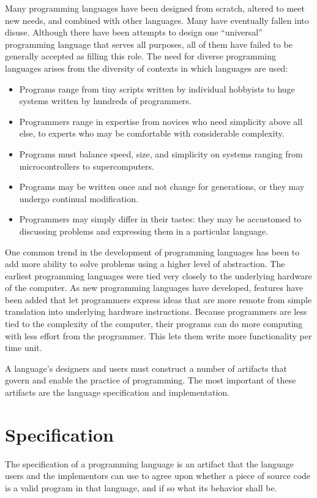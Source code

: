 Many programming languages have been designed from scratch, altered to meet
new needs, and combined with other languages. Many have eventually fallen
into disuse. Although there have been attempts to design one ``universal''
programming language that serves all purposes, all of them have failed to
be generally accepted as filling this role. The need for diverse
programming languages arises from the diversity of contexts in which
languages are used:
\begin{itemize}
  \item Programs range from tiny scripts written by individual hobbyists to
    huge systems written by hundreds of programmers.
  \item Programmers range in expertise from novices who need simplicity above
    all else, to experts who may be comfortable with considerable complexity.
  \item Programs must balance speed, size, and simplicity on systems ranging
    from microcontrollers to supercomputers.
  \item Programs may be written once and not change for generations, or they
    may undergo continual modification.
  \item Programmers may simply differ in their tastes: they may be accustomed
    to discussing problems and expressing them in a particular language.
\end{itemize}

One common trend in the development of programming languages has been to
add more ability to solve problems using a higher level of abstraction. The
earliest programming languages were tied very closely to the underlying
hardware of the computer. As new programming languages have developed,
features have been added that let programmers express ideas that are more
remote from simple translation into underlying hardware instructions.
Because programmers are less tied to the complexity of the computer, their
programs can do more computing with less effort from the programmer. This
lets them write more functionality per time unit.

A language's designers and users must construct a number of artifacts that
govern and enable the practice of programming. The most important of these
artifacts are the language specification and implementation.

\section{Specification}
The specification of a programming language is an artifact that the
language users and the implementors can use to agree upon whether a piece
of source code is a valid program in that language, and if so what its
behavior shall be.

